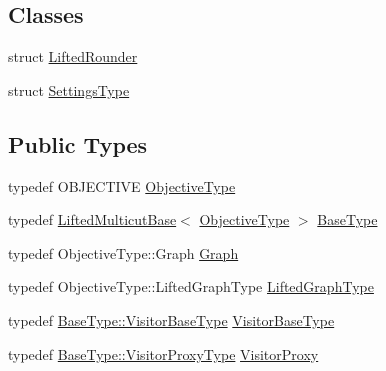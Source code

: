 \subsection*{Classes}
\begin{DoxyCompactItemize}
\item 
struct \hyperlink{structnifty_1_1graph_1_1optimization_1_1lifted__multicut_1_1LiftedMulticutMp_1_1LiftedRounder}{Lifted\+Rounder}
\item 
struct \hyperlink{structnifty_1_1graph_1_1optimization_1_1lifted__multicut_1_1LiftedMulticutMp_1_1SettingsType}{Settings\+Type}
\end{DoxyCompactItemize}
\subsection*{Public Types}
\begin{DoxyCompactItemize}
\item 
typedef O\+B\+J\+E\+C\+T\+I\+V\+E \hyperlink{classnifty_1_1graph_1_1optimization_1_1lifted__multicut_1_1LiftedMulticutMp_a29357bbcb251434565fb393ce3b5d6d0}{Objective\+Type}
\item 
typedef \hyperlink{classnifty_1_1graph_1_1optimization_1_1lifted__multicut_1_1LiftedMulticutBase}{Lifted\+Multicut\+Base}$<$ \hyperlink{classnifty_1_1graph_1_1optimization_1_1lifted__multicut_1_1LiftedMulticutMp_a29357bbcb251434565fb393ce3b5d6d0}{Objective\+Type} $>$ \hyperlink{classnifty_1_1graph_1_1optimization_1_1lifted__multicut_1_1LiftedMulticutMp_a2f72b0242500bbb04eb1fc7279ead53a}{Base\+Type}
\item 
typedef Objective\+Type\+::\+Graph \hyperlink{classnifty_1_1graph_1_1optimization_1_1lifted__multicut_1_1LiftedMulticutMp_ab3e461db265865b7c42235817bae0f03}{Graph}
\item 
typedef Objective\+Type\+::\+Lifted\+Graph\+Type \hyperlink{classnifty_1_1graph_1_1optimization_1_1lifted__multicut_1_1LiftedMulticutMp_ae597a7fa49231746084cb9b3419e6180}{Lifted\+Graph\+Type}
\item 
typedef \hyperlink{classnifty_1_1graph_1_1optimization_1_1common_1_1SolverBase_a5a14d64c70a9cc0eebc7d71d2b089f9b}{Base\+Type\+::\+Visitor\+Base\+Type} \hyperlink{classnifty_1_1graph_1_1optimization_1_1lifted__multicut_1_1LiftedMulticutMp_af0ec21b5408072a6fee250667b28e7a8}{Visitor\+Base\+Type}
\item 
typedef \hyperlink{classnifty_1_1graph_1_1optimization_1_1common_1_1SolverBase_a58913ea9ab9232ff72608b710c1012d0}{Base\+Type\+::\+Visitor\+Proxy\+Type} \hyperlink{classnifty_1_1graph_1_1optimization_1_1lifted__multicut_1_1LiftedMulticutMp_a61d89421f75d06b01a120cc6a4aa2154}{Visitor\+Proxy}

\end{DoxyCompactItemize}
